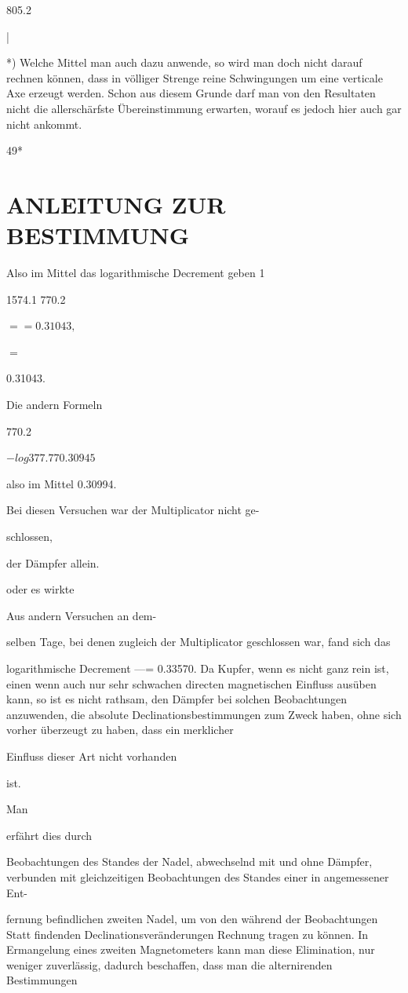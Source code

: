 \documentclass[12pt,a4paper]{article}
\begin{document}
805.2

|

*) Welche Mittel man auch dazu anwende, so wird man doch nicht darauf rechnen können, dass in völliger Strenge reine Schwingungen um eine verticale Axe erzeugt werden. Schon aus diesem Grunde darf man von den Resultaten nicht die allerschärfste Übereinstimmung erwarten, worauf es jedoch hier auch gar nicht ankommt.

49*

\section*{ANLEITUNG ZUR BESTIMMUNG}
Also im Mittel das logarithmische Decrement geben 1

1574.1 770.2

$== 0.31043,$

$=$

0.31043.

Die andern Formeln

770.2

$- log 377.7 7 0.30945$

also im Mittel 0.30994.

Bei diesen Versuchen war der Multiplicator nicht ge-

schlossen,

der Dämpfer allein.

oder es wirkte

Aus andern Versuchen an dem-

selben Tage, bei denen zugleich der Multiplicator geschlossen war, fand sich das

logarithmische Decrement —= 0.33570. Da Kupfer, wenn es nicht ganz rein ist, einen wenn auch nur sehr schwachen directen magnetischen Einfluss ausüben kann, so ist es nicht rathsam, den Dämpfer bei solchen Beobachtungen anzuwenden, die absolute Declinationsbestimmungen zum Zweck haben, ohne sich vorher überzeugt zu haben, dass ein merklicher

Einfluss dieser Art nicht vorhanden

ist.

Man

erfährt dies durch

Beobachtungen des Standes der Nadel, abwechselnd mit und ohne Dämpfer, verbunden mit gleichzeitigen Beobachtungen des Standes einer in angemessener Ent-

fernung befindlichen zweiten Nadel, um von den während der Beobachtungen Statt findenden Declinationsveränderungen Rechnung tragen zu können. In Ermangelung eines zweiten Magnetometers kann man diese Elimination, nur weniger zuverlässig, dadurch beschaffen, dass man die alternirenden Bestimmungen
\end{document}

